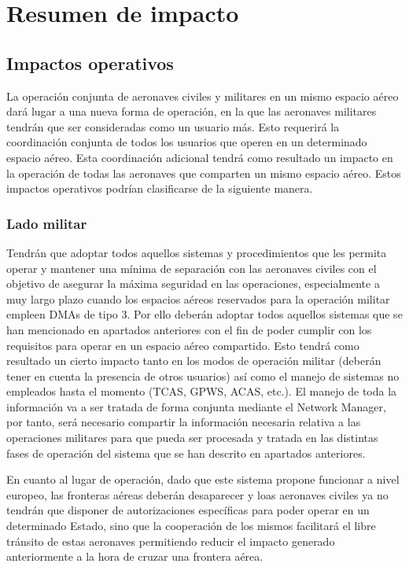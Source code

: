 \section{Resumen de impacto}

\subsection{Impactos operativos}

La operación conjunta de aeronaves civiles y militares en un mismo espacio aéreo dará lugar a una nueva forma de operación, en la que las aeronaves militares tendrán que ser consideradas como un usuario más. Esto requerirá la coordinación conjunta de todos los usuarios que operen en un determinado espacio aéreo. Esta coordinación adicional tendrá como resultado un impacto en la operación de todas las aeronaves que comparten un mismo espacio aéreo. Estos impactos operativos podrían clasificarse de la siguiente manera.

\subsubsection{Lado militar}

Tendrán que adoptar todos aquellos sistemas y procedimientos que les permita operar y mantener una mínima de separación con las aeronaves civiles con el objetivo de asegurar la máxima seguridad en las operaciones, especialmente a muy largo plazo cuando los espacios aéreos reservados para la operación militar empleen DMAs de tipo 3. Por ello deberán adoptar todos aquellos sistemas que se han mencionado en apartados anteriores con el fin de poder cumplir con los requisitos para operar en un espacio aéreo compartido. Esto tendrá como resultado un cierto impacto tanto en los modos de operación militar (deberán tener en cuenta la presencia de otros usuarios) así como el manejo de sistemas no empleados hasta el momento (TCAS, GPWS, ACAS, etc.). El manejo de toda la información va a ser tratada de forma conjunta mediante el Network Manager, por tanto, será necesario compartir la información necesaria relativa a las operaciones militares para que pueda ser procesada y tratada en las distintas fases de operación del sistema que se han descrito en apartados anteriores. 

En cuanto al lugar de operación, dado que este sistema propone funcionar a nivel europeo, las fronteras aéreas deberán desaparecer y loas aeronaves civiles ya no tendrán que disponer de autorizaciones específicas para poder operar en un determinado Estado, sino que la cooperación de los mismos facilitará el libre tránsito de estas aeronaves permitiendo reducir el impacto generado anteriormente a la hora de cruzar una frontera aérea. 

